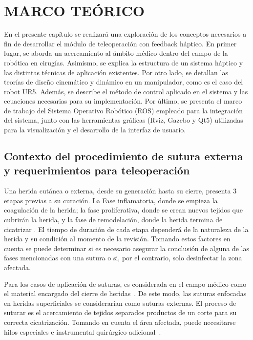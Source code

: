 \chapter{MARCO TEÓRICO}

En el presente capítulo se realizará una exploración de los conceptos
necesarios a fin de desarrollar el módulo de teleoperación con feedback
háptico. En primer lugar, se aborda un acercamiento al ámbito médico dentro del
campo de la robótica en cirugías. Asimismo, se explica la estructura de un
sistema háptico y las distintas técnicas de aplicación existentes. Por otro
lado, se detallan las teorías de diseño cinemático y dinámico en un
manipulador, como es el caso del robot UR5. Además, se describe el método de
control aplicado en el sistema y las ecuaciones necesarias para su
implementación. Por último, se presenta el marco de trabajo del Sistema
Operativo Robótico (ROS) empleado para la integración del sistema, junto con
las herramientas gráficas (Rviz, Gazebo y Qt5) utilizadas para la
visualización y el desarrollo de la interfaz de usuario.

\section{Contexto del procedimiento de sutura externa y requerimientos para
  teleoperación}
Una herida cutánea o externa, desde su generación hasta su cierre, presenta 3
etapas previas a su curación. La Fase inflamatoria, donde se empieza la
coagulación de la herida; la fase proliferativa, donde se crean nuevos tejidos
que cubrirán la herida, y la fase de remodelación, donde la herida termina de
cicatrizar \cite{Cicatritacion}. El tiempo de duración de cada etapa dependerá
de la naturaleza de la herida y su condición al momento de la revisión. Tomando
estos factores en cuenta se puede determinar si es necesario asegurar la
conclusión de alguna de las fases mencionadas con una sutura o si, por el
contrario, solo desinfectar la zona afectada.

Para los casos de aplicación de suturas, es considerada en el campo médico como
el material encargado del cierre de heridas~\cite{GONZALEZ-CELY2018}. De este
modo, las suturas enfocadas en heridas superficiales se considerarían como
suturas externas. El proceso de suturar es el acercamiento de tejidos separados
productos de un corte para su correcta cicatrización. Tomando en cuenta el área
afectada, puede necesitarse hilos especiales  e instrumental quirúrgico
adicional~\cite{GONZALEZ-CELY2018}.

